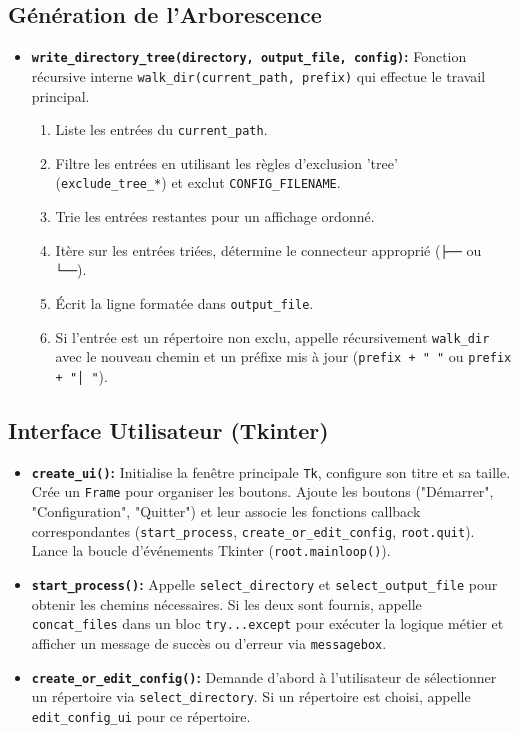 \documentclass[11pt, a4paper]{article}
\begin{document}
\subsection{Génération de l'Arborescence}
\begin{itemize}
    \item \textbf{\texttt{write\_directory\_tree(directory, output\_file, config)}:} Fonction récursive interne \texttt{walk\_dir(current\_path, prefix)} qui effectue le travail principal.
        \begin{enumerate}
            \item Liste les entrées du \texttt{current\_path}.
            \item Filtre les entrées en utilisant les règles d'exclusion 'tree' (\texttt{exclude\_tree\_*}) et exclut \texttt{CONFIG\_FILENAME}.
            \item Trie les entrées restantes pour un affichage ordonné.
            \item Itère sur les entrées triées, détermine le connecteur approprié (\texttt{├──} ou \texttt{└──}).
            \item Écrit la ligne formatée dans \texttt{output\_file}.
            \item Si l'entrée est un répertoire non exclu, appelle récursivement \texttt{walk\_dir} avec le nouveau chemin et un préfixe mis à jour (\texttt{prefix + "    "} ou \texttt{prefix + "│   "}).
        \end{enumerate}
\end{itemize}

\subsection{Interface Utilisateur (Tkinter)}
\begin{itemize}
    \item \textbf{\texttt{create\_ui()}:} Initialise la fenêtre principale \texttt{Tk}, configure son titre et sa taille. Crée un \texttt{Frame} pour organiser les boutons. Ajoute les boutons ("Démarrer", "Configuration", "Quitter") et leur associe les fonctions callback correspondantes (\texttt{start\_process}, \texttt{create\_or\_edit\_config}, \texttt{root.quit}). Lance la boucle d'événements Tkinter (\texttt{root.mainloop()}).
    \item \textbf{\texttt{start\_process()}:} Appelle \texttt{select\_directory} et \texttt{select\_output\_file} pour obtenir les chemins nécessaires. Si les deux sont fournis, appelle \texttt{concat\_files} dans un bloc \texttt{try...except} pour exécuter la logique métier et afficher un message de succès ou d'erreur via \texttt{messagebox}.
    \item \textbf{\texttt{create\_or\_edit\_config()}:} Demande d'abord à l'utilisateur de sélectionner un répertoire via \texttt{select\_directory}. Si un répertoire est choisi, appelle \texttt{edit\_config\_ui} pour ce répertoire.
\end{itemize}
\end{document}
